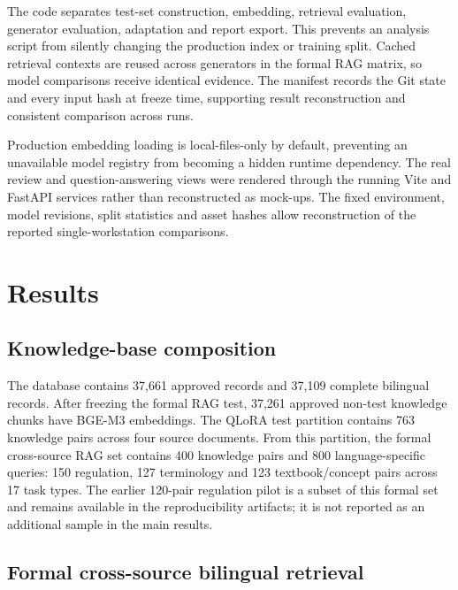 The code separates test-set construction, embedding, retrieval evaluation, generator evaluation, adaptation and report export. This prevents an analysis script from silently changing the production index or training split. Cached retrieval contexts are reused across generators in the formal RAG matrix, so model comparisons receive identical evidence. The manifest records the Git state and every input hash at freeze time, supporting result reconstruction and consistent comparison across runs.

Production embedding loading is local-files-only by default, preventing an unavailable model registry from becoming a hidden runtime dependency. The real review and question-answering views were rendered through the running Vite and FastAPI services rather than reconstructed as mock-ups. The fixed environment, model revisions, split statistics and asset hashes allow reconstruction of the reported single-workstation comparisons.

\section{Results}

\subsection{Knowledge-base composition}

The database contains 37,661 approved records and 37,109 complete bilingual records. After freezing the formal RAG test, 37,261 approved non-test knowledge chunks have BGE-M3 embeddings. The QLoRA test partition contains 763 knowledge pairs across four source documents. From this partition, the formal cross-source RAG set contains 400 knowledge pairs and 800 language-specific queries: 150 regulation, 127 terminology and 123 textbook/concept pairs across 17 task types. The earlier 120-pair regulation pilot is a subset of this formal set and remains available in the reproducibility artifacts; it is not reported as an additional sample in the main results.

\subsection{Formal cross-source bilingual retrieval}

